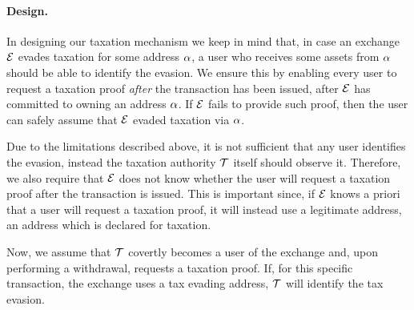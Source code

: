 \paragraph{Design.}

In designing our taxation mechanism we keep in mind that, in case an exchange
$\mathcal{E}$ evades taxation for some address $\alpha$, a user who receives
some assets from $\alpha$ should be able to identify the evasion.  We ensure
this by enabling every user to request a taxation proof \emph{after} the
transaction has been issued, \ie after $\mathcal{E}$ has committed to owning an
address $\alpha$. If $\mathcal{E}$ fails to provide such proof, then the user
can safely assume that $\mathcal{E}$ evaded taxation via $\alpha$.

Due to the limitations described above, it is not sufficient that any user
identifies the evasion, instead the taxation authority $\mathcal{T}$ itself should
observe it. Therefore, we also require that $\mathcal{E}$ does not know whether
the user will request a taxation proof after the transaction is issued. This is
important since, if $\mathcal{E}$ knows a priori that a user will request a
taxation proof, it will instead use a legitimate address, \ie an address which
is declared for taxation.

Now, we assume that $\mathcal{T}$ covertly becomes a user of the exchange and,
upon performing a withdrawal, requests a taxation proof. If, for this specific
transaction, the exchange uses a tax evading address, $\mathcal{T}$ will identify
the tax evasion.
